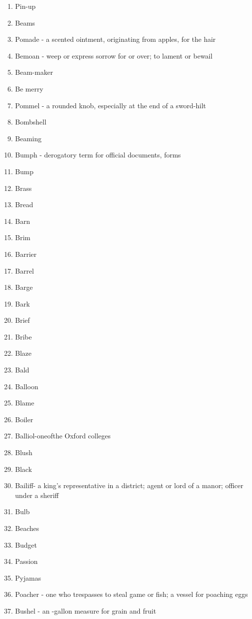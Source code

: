 \begin{enumerate}
        \item Pin-up
        \item Beams
        \item Pomade - a scented ointment, originating from apples, for the hair
        \item Bemoan - weep or express sorrow for or over; to lament or bewail
        \item Beam-maker
        \item Be merry
        \item Pommel - a rounded knob, especially at the end of a sword-hilt
        \item Bombshell
        \item Beaming
        \item Bumph - derogatory term for official documents, forms
        \item Bump
        \item Brass
        \item Bread
        \item Barn
        \item Brim
        \item Barrier
        \item Barrel
        \item Barge
        \item Bark
        \item Brief
        \item Bribe
        \item Blaze
        \item Bald
        \item Balloon
        \item Blame
        \item Boiler
        \item Balliol-oneofthe Oxford colleges
        \item Blush
        \item Black
        \item Bailiff- a king's representative in a district; agent or lord of a manor; officer under a sheriff
        \item Bulb
        \item Beaches
        \item Budget
        \item Passion
        \item Pyjamas
        \item Poacher - one who trespasses to steal game or fish; a vessel for poaching eggs
        \item Bushel - an -gallon measure for grain and fruit

\end{enumerate}
